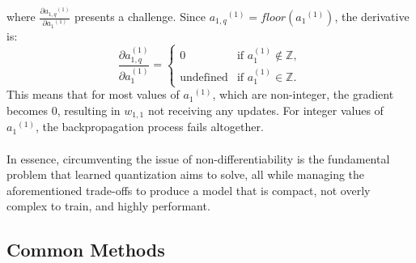   \noindent where \( \frac{\partial {a_{1,q}}^{(1)}}{\partial {a_1}^{(1)}} \) presents a challenge. 
  Since \(  {a_{1,q}}^{(1)} =  floor({a_1}^{(1)}) \), the derivative is: 
            \[
            \frac{\partial a_{1,q}^{(1)}}{\partial a_{1}^{(1)}} =
            \begin{cases} 
                0 & \text{if } a_{1}^{(1)} \notin \mathbb{Z}, \\
                \text{undefined} & \text{if } a_{1}^{(1)} \in \mathbb{Z}.
            \end{cases}
            \]
  This means that for most values of \( {a_1}^{(1)} \), which are non-integer, the gradient becomes $0$, resulting in 
  $w_{1,1}$ not receiving any updates. For integer values of \( {a_1}^{(1)} \), the backpropagation process fails altogether.
\\
\\
In essence, circumventing the issue of non-differentiability is the fundamental problem that learned quantization aims to solve,
all while managing the aforementioned trade-offs to produce a model that is compact, not overly complex to train,
and highly performant.


\subsection{Common Methods}
\label{subsec:subsection2}

